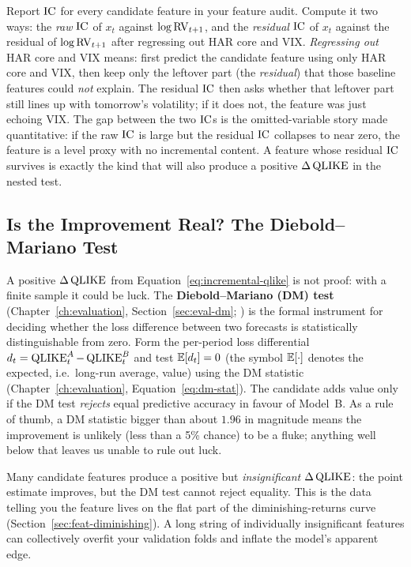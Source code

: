 \begin{projectconnection}
Report $\operatorname{IC}$ for every candidate feature in your feature audit. Compute it two ways: the \emph{raw} $\operatorname{IC}$ of $x_t$ against $\log\operatorname{RV}_{t+1}$, and the \emph{residual} $\operatorname{IC}$ of $x_t$ against the residual of $\log\operatorname{RV}_{t+1}$ after regressing out HAR core and VIX. \emph{Regressing out} HAR core and VIX means: first predict the candidate feature using only HAR core and VIX, then keep only the leftover part (the \emph{residual}) that those baseline features could \emph{not} explain. The residual $\operatorname{IC}$ then asks whether that leftover part still lines up with tomorrow's volatility; if it does not, the feature was just echoing VIX. The gap between the two $\operatorname{IC}$s is the omitted-variable story made quantitative: if the raw $\operatorname{IC}$ is large but the residual $\operatorname{IC}$ collapses to near zero, the feature is a level proxy with no incremental content. A feature whose residual $\operatorname{IC}$ survives is exactly the kind that will also produce a positive $\Delta\operatorname{QLIKE}$ in the nested test.
\end{projectconnection}

\subsection{Is the Improvement Real? The Diebold--Mariano Test}\label{sec:feat-incremental-dm}

A positive $\Delta\operatorname{QLIKE}$ from Equation~\ref{eq:incremental-qlike} is not proof: with a finite sample it could be luck. The \textbf{Diebold--Mariano (DM) test} (Chapter~\ref{ch:evaluation}, Section~\ref{sec:eval-dm}; \citealp{DieboldMariano1995}) is the formal instrument for deciding whether the loss difference between two forecasts is statistically distinguishable from zero. Form the per-period loss differential $d_t = \operatorname{QLIKE}_t^A - \operatorname{QLIKE}_t^B$ and test $\mathbb{E}[d_t] = 0$ (the symbol $\mathbb{E}[\cdot]$ denotes the expected, i.e.\ long-run average, value) using the DM statistic (Chapter~\ref{ch:evaluation}, Equation~\ref{eq:dm-stat}). The candidate adds value only if the DM test \emph{rejects} equal predictive accuracy in favour of Model~B. As a rule of thumb, a DM statistic bigger than about $1.96$ in magnitude means the improvement is unlikely (less than a 5\% chance) to be a fluke; anything well below that leaves us unable to rule out luck.

\begin{warning}
Many candidate features produce a positive but \emph{insignificant} $\Delta\operatorname{QLIKE}$: the point estimate improves, but the DM test cannot reject equality. This is the data telling you the feature lives on the flat part of the diminishing-returns curve (Section~\ref{sec:feat-diminishing}). A long string of individually insignificant features can collectively overfit your validation folds and inflate the model's apparent edge.
\end{warning}

